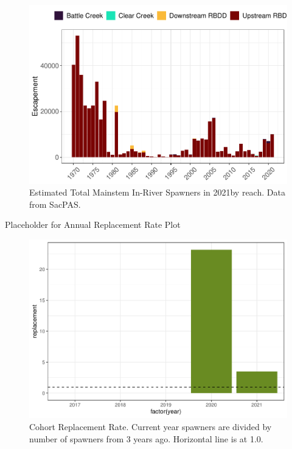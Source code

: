 \documentclass[
]{book}
\theoremstyle{definition}
\theoremstyle{definition}
\theoremstyle{definition}
\theoremstyle{definition}
\theoremstyle{remark}
\begin{document}
\begin{figure}
\centering
\includegraphics{_main_files/figure-latex/unnamed-chunk-9-1.pdf}
\caption{\label{fig:unnamed-chunk-9}Estimated Total Mainstem In-River Spawners in 2021by reach. Data from SacPAS.}
\end{figure}

Placeholder for Annual Replacement Rate Plot

\begin{figure}
\centering
\includegraphics{_main_files/figure-latex/cohortreplacement-fig-1.pdf}
\caption{\label{fig:cohortreplacement-fig}Cohort Replacement Rate. Current year spawners are divided by number of spawners from 3 years ago. Horizontal line is at 1.0.}
\end{figure}
\end{document}
